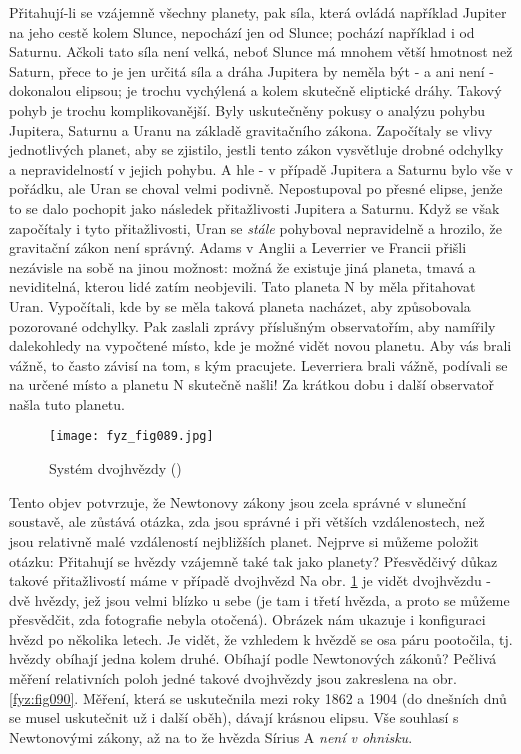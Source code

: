 {    Při\-ta\-hují-li se vzájemně všechny planety, pak síla, která ovládá například Jupiter na jeho 
    cestě kolem Slunce, nepochází jen od Slunce; pochází například i od Saturnu. Ačkoli tato síla 
    není velká, neboť Slunce má mnohem větší hmotnost než Saturn, přece to je jen určitá síla a 
    dráha Jupitera by neměla být - a ani není - dokonalou elipsou; je trochu vychýlená a 
     kolem skutečně eliptické dráhy. Takový pohyb je trochu komplikovanější. Byly 
    uskutečněny pokusy o analýzu pohybu Jupitera, Saturnu a Uranu na základě gravitačního zákona. 
    Započítaly se vlivy jednotlivých planet, aby se zjistilo, jestli tento zákon vysvětluje drobné 
    odchylky a nepravidelností v jejich pohybu. A hle - v případě Jupitera a Saturnu bylo vše v 
    pořádku, ale Uran se choval velmi podivně. Nepostupoval po přesné elipse, jenže to se dalo 
    pochopit jako následek přitažlivosti Jupitera a Saturnu. Když se však započítaly i tyto 
    přitažlivosti, Uran se \emph{stále} pohyboval nepravidelně a hrozilo, že gravitační zákon není 
    správný. Adams v Anglii a Leverrier ve Francii přišli nezávisle na sobě na jinou možnost: možná 
    že existuje jiná planeta, tmavá a neviditelná, kterou lidé zatím neobjevili. Tato planeta N by 
    měla přitahovat Uran. Vypočítali, kde by se měla taková planeta nacházet, aby způsobovala 
    pozorované odchylky. Pak zaslali zprávy příslušným observatořím, aby namířily dalekohledy na 
    vypočtené místo, kde je možné vidět novou planetu. Aby vás brali vážně, to často závisí na tom, 
    s kým pracujete. Leverriera brali vážně, podívali se na určené místo a planetu N skutečně 
    našli! Za krátkou dobu i další observatoř našla tuto planetu.

    \begin{figure}[ht!]  %
      \centering
      \texttt{[image: fyz\_fig089.jpg]}
      \caption{Systém dvojhvězdy (\cite[s.~99]{Feynman01})}
      \label{fyz:fig089}
    \end{figure}
    
    Tento objev potvrzuje, že Newtonovy zákony jsou zcela správné v sluneční soustavě, ale zůstává 
    otázka, zda jsou správné i při větších vzdálenostech, než jsou relativně malé vzdáleností 
    nejbližších planet. Nejprve si můžeme položit otázku: Přitahují se hvězdy vzájemně také tak 
    jako planety? Přesvědčivý důkaz takové přitažlivostí máme v případě dvojhvězd Na obr. 
    \ref{fyz:fig089} je vidět dvojhvězdu - dvě hvězdy, jež jsou velmi blízko u sebe (je tam i třetí 
    hvězda, a proto se můžeme přesvědčit, zda fotografie nebyla otočená). Obrázek nám ukazuje i 
    konfiguraci hvězd po několika letech. Je vidět, že vzhledem k  hvězdě se osa páru 
    pootočila, tj. hvězdy obíhají jedna kolem druhé. Obíhají podle Newtonových zákonů? Pečlivá 
    měření relativních poloh jedné takové dvojhvězdy jsou zakreslena na obr. \ref{fyz:fig090}. 
    Měření, která se uskutečnila mezi roky \num{1862} a \num{1904} (do dnešních dnů se musel 
    uskutečnit už i další oběh), dávají krásnou elipsu. Vše souhlasí s Newtonovými zákony, až na to 
    že hvězda Sírius A \emph{není v ohnisku}.  

}

